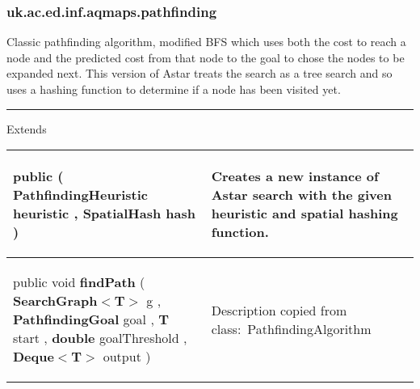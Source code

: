 \subsubsection*{ uk.ac.ed.inf.aqmaps.pathfinding }
 {\scriptsize Classic pathfinding algorithm, modified BFS which uses both the cost to reach a node and the predicted cost from that node to the goal\newline%
 to chose the nodes to be expanded next. This version of Astar treats the search as a tree search and so uses a hashing function to determine if a node has been visited yet.
 
\vspace*{4pt} \hrule \vspace*{3pt}
Extends \textbf{ \hyperref[tab:SearchNode]{\color{blue}{SearchNode}} }
\vspace*{-5pt} 
\begin{tabularx}{\linewidth}{X|m{}}
\label{tab:AstarTreeSearch}
\begin{raggedleft}public  \textbf{\hyperref[tab:AstarTreeSearch]{\color{blue}{AstarTreeSearch}} }(\newline \hfill 
\hspace*{ 5pt} \textbf{PathfindingHeuristic} heuristic , \newline
 \hspace*{ 5pt} \textbf{SpatialHash} hash  )
\end{raggedleft} &
 Creates a new instance of Astar search with the given heuristic and spatial hashing function.\\ \hline 
\begin{raggedleft}public void \textbf{findPath }(\newline \hfill 
\hspace*{ 5pt} \textbf{SearchGraph$<$T$>$} g , \newline
 \hspace*{ 5pt} \textbf{PathfindingGoal} goal , \newline
 \hspace*{ 5pt} \textbf{T} start , \newline
 \hspace*{ 5pt} \textbf{double} goalThreshold , \newline
 \hspace*{ 5pt} \textbf{Deque$<$T$>$} output  )
\end{raggedleft} &
 Description copied from class:~PathfindingAlgorithm\\\end{tabularx}
}
